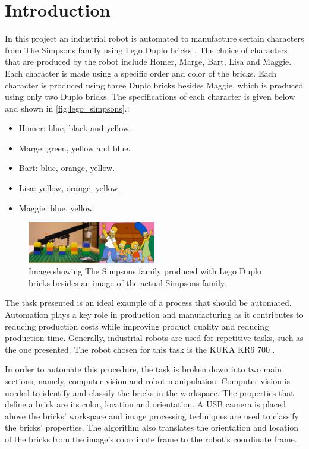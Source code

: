 \chapter{Introduction}\label{chap:introduction}
In this project an industrial robot is automated to manufacture certain characters from The Simpsons family using Lego Duplo bricks \cite{duplo}. The choice of characters that are produced by the robot include Homer, Marge, Bart, Lisa and Maggie. Each character is made using a specific order and color of the bricks. Each character is produced using three Duplo bricks besides Maggie, which is produced using only two Duplo bricks. The specifications of each character is given below and shown in \autoref{fig:lego_simpsons}.:

\begin{itemize}
	\item Homer: blue, black and yellow.
	\item Marge: green, yellow and blue.
	\item Bart: blue, orange, yellow.
	\item Lisa: yellow, orange, yellow.
	\item Maggie: blue, yellow.
\end{itemize}

\begin{figure}[H]
    \includegraphics[width=0.5\textwidth]{figures/lego_simpsons.pdf}
    \caption{Image showing The Simpsons family produced with Lego Duplo bricks besides an image of the actual Simpsons family.}
    \label{fig:lego_simpsons}
\end{figure}

The task presented is an ideal example of a process that should be automated. Automation plays a key role in production and manufacturing as it contributes to reducing production costs while improving product quality and reducing production time. Generally, industrial robots are used for repetitive tasks, such as the one presented. The robot chosen for this task is the KUKA KR6 700 \cite{kuka}.

In order to automate this procedure, the task is broken down into two main sections, namely, computer vision and robot manipulation. Computer vision is needed to identify and classify the bricks in the workspace. The properties that define a brick are its color, location and orientation. A USB camera is placed above the bricks' workspace and image processing techniques are used to classify the bricks' properties. The algorithm also translates the orientation and location of the bricks from the image's coordinate frame to the robot's coordinate frame.

